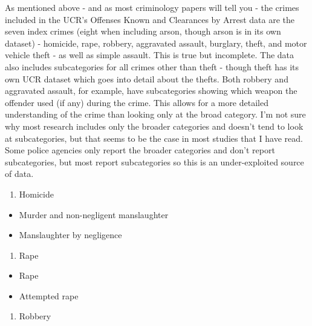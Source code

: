 \documentclass[
  12pt,
  openany]{book}
\providecommand{\tightlist}{%
  \setlength{\itemsep}{0pt}\setlength{\parskip}{0pt}}
\begin{document}
As mentioned above - and as most criminology papers will tell you - the crimes included in the UCR's Offenses Known and Clearances by Arrest data are the seven index crimes (eight when including arson, though arson is in its own dataset) - homicide, rape, robbery, aggravated assault, burglary, theft, and motor vehicle theft - as well as simple assault. This is true but incomplete. The data also includes subcategories for all crimes other than theft - though theft has its own UCR dataset which goes into detail about the thefts. Both robbery and aggravated assault, for example, have subcategories showing which weapon the offender used (if any) during the crime. This allows for a more detailed understanding of the crime than looking only at the broad category. I'm not sure why most research includes only the broader categories and doesn't tend to look at subcategories, but that seems to be the case in most studies that I have read. Some police agencies only report the broader categories and don't report subcategories, but most report subcategories so this is an under-exploited source of data.

\begin{enumerate}
\def\labelenumi{\arabic{enumi}.}
\tightlist
\item
  Homicide\\
\end{enumerate}

\begin{itemize}
\tightlist
\item
  Murder and non-negligent manslaughter\\
\item
  Manslaughter by negligence\\
\end{itemize}

\begin{enumerate}
\def\labelenumi{\arabic{enumi}.}
\setcounter{enumi}{1}
\tightlist
\item
  Rape\\
\end{enumerate}

\begin{itemize}
\tightlist
\item
  Rape\\
\item
  Attempted rape\\
\end{itemize}

\begin{enumerate}
\def\labelenumi{\arabic{enumi}.}
\setcounter{enumi}{2}
\tightlist
\item
  Robbery\\
\end{enumerate}
\end{document}
